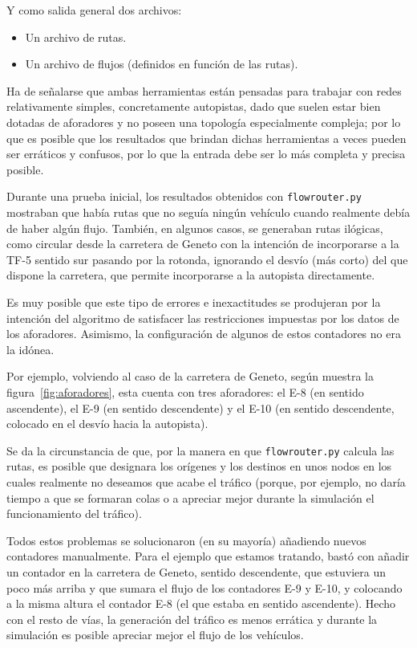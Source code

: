 Y como salida general dos archivos:

\begin{itemize}
    \item Un archivo de rutas.
    \item Un archivo de flujos (definidos en función de las rutas).
\end{itemize}

Ha de señalarse que ambas herramientas están pensadas para trabajar con redes relativamente simples, concretamente autopistas, dado que suelen estar bien dotadas de aforadores y no poseen una topología especialmente compleja; por lo que es posible que los resultados que brindan dichas herramientas a veces pueden ser erráticos y confusos, por lo que la entrada debe ser lo más completa y precisa posible.

Durante una prueba inicial, los resultados obtenidos con \texttt{flowrouter.py} mostraban que había rutas que no seguía ningún vehículo cuando realmente debía de haber algún flujo. También, en algunos casos, se generaban rutas ilógicas, como circular desde la carretera de Geneto con la intención de incorporarse a la TF-5 sentido sur pasando por la rotonda, ignorando el desvío (más corto) del que dispone la carretera, que permite incorporarse a la autopista directamente.

Es muy posible que este tipo de errores e inexactitudes se produjeran por la intención del algoritmo de satisfacer las restricciones impuestas por los datos de los aforadores. Asimismo, la configuración de algunos de estos contadores no era la idónea. 

Por ejemplo, volviendo al caso de la carretera de Geneto, según muestra la figura~\ref{fig:aforadores}, esta cuenta con tres aforadores: el E-8 (en sentido ascendente), el E-9 (en sentido descendente) y el E-10 (en sentido descendente, colocado en el desvío hacia la autopista).

Se da la circunstancia de que, por la manera en que \texttt{flowrouter.py} calcula las rutas, es posible que designara los orígenes y los destinos en unos nodos en los cuales realmente no deseamos que acabe el tráfico (porque, por ejemplo, no daría tiempo a que se formaran colas o a apreciar mejor durante la simulación el funcionamiento del tráfico).

Todos estos problemas se solucionaron (en su mayoría) añadiendo nuevos contadores manualmente. Para el ejemplo que estamos tratando, bastó con añadir un contador en la carretera de Geneto, sentido descendente, que estuviera un poco más arriba y que sumara el flujo de los contadores E-9 y E-10, y colocando a la misma altura el contador E-8 (el que estaba en sentido ascendente). Hecho con el resto de vías, la generación del tráfico es menos errática y durante la simulación es posible apreciar mejor el flujo de los vehículos.

